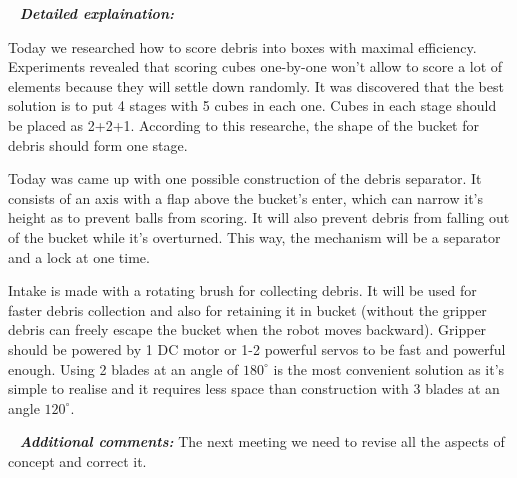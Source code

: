    \newline
  \textit{\textbf{Detailed explaination:}}
  \begin{enumerate*}
  	\item Today we researched how to score debris into boxes with maximal efficiency. Experiments revealed that scoring cubes one-by-one won't allow to score a lot of elements because they will settle down randomly. It was discovered that the best solution is to put 4 stages with 5 cubes in each one. Cubes in each stage should be placed as 2+2+1. According to this researche, the shape of the bucket for debris should form one stage.
  	
  	\item Today was came up with one possible construction of the debris separator. It consists of an axis with a flap above the bucket's enter, which can narrow it's height as to prevent balls from scoring. It will also prevent debris from falling out of the bucket while it's overturned. This way, the mechanism will be a separator and a lock at one time.
  
  	
  	\item Intake is made with a rotating brush for collecting debris. It will be used for faster debris collection and also for retaining it in bucket (without the gripper debris can freely escape the bucket when the robot moves backward). Gripper should be powered by 1 DC motor or 1-2 powerful servos to be fast and powerful enough. Using 2 blades at an angle of $180^\circ$ is the most convenient solution as it's simple to realise and it requires less space than construction with 3 blades at an angle $120^\circ$.
  	
  \end{enumerate*}
  
   \newline
  \textit{\textbf{Additional comments:}} The next meeting we need to revise all the aspects of concept and correct it.
  
\fillpage
